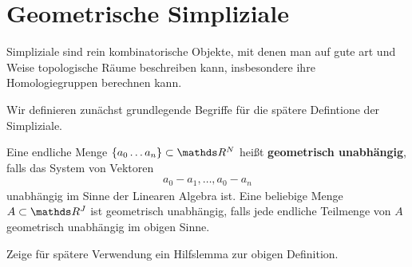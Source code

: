 





\section{Geometrische Simpliziale}

Simpliziale sind rein kombinatorische Objekte, mit denen man auf gute
art und Weise topologische Räume beschreiben kann, insbesondere ihre
Homologiegruppen berechnen kann.

Wir definieren zunächst grundlegende Begriffe für die spätere
Defintione der Simpliziale.

\begin{Def}
  \label{def:1}
  Eine endliche Menge $\{ a_0\ldots a_n \} \subset \R^N$ heißt
  \textbf{geometrisch unabhängig}, falls das System von Vektoren
  \begin{gather*}
    a_0 - a_1 , \ldots , a_0 - a_n
  \end{gather*}
  unabhängig im Sinne der Linearen Algebra ist. Eine beliebige Menge
  $A \subset \R^J$ ist geometrisch unabhängig, falls jede endliche
  Teilmenge von $A$ geometrisch unabhängig im obigen Sinne.

\end{Def}

Zeige für spätere Verwendung ein Hilfslemma zur obigen Definition.

